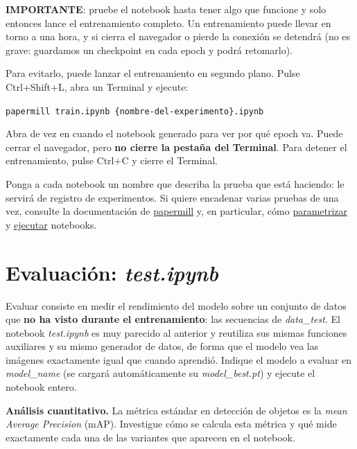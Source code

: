 \documentclass[12pt,a4paper]{article}
\begin{document}
\begin{framed}
    \textbf{IMPORTANTE}: pruebe el notebook hasta tener algo que funcione y solo entonces lance el entrenamiento completo. Un entrenamiento puede llevar en torno a una hora, y si cierra el navegador o pierde la conexión se detendrá (no es grave: guardamos un checkpoint en cada epoch y podrá retomarlo).

    Para evitarlo, puede lanzar el entrenamiento en segundo plano. Pulse Ctrl+Shift+L, abra un Terminal y ejecute:

    \begin{center}
        \texttt{papermill train.ipynb \{nombre-del-experimento\}.ipynb}
    \end{center}

    Abra de vez en cuando el notebook generado para ver por qué epoch va. Puede cerrar el navegador, pero \textbf{no cierre la pestaña del Terminal}. Para detener el entrenamiento, pulse Ctrl+C y cierre el Terminal.

    Ponga a cada notebook un nombre que describa la prueba que está haciendo: le servirá de registro de experimentos. Si quiere encadenar varias pruebas de una vez, consulte la documentación de \href{https://papermill.readthedocs.io/en/latest/index.html}{papermill} y, en particular, cómo \href{https://papermill.readthedocs.io/en/latest/usage-parameterize.html}{parametrizar} y \href{https://papermill.readthedocs.io/en/latest/usage-execute.html}{ejecutar} notebooks.
\end{framed}


\section{Evaluación: \textit{test.ipynb}}
\label{sec:semana2-test}

Evaluar consiste en medir el rendimiento del modelo sobre un conjunto de datos que \textbf{no ha visto durante el entrenamiento}: las secuencias de \textit{data\_test}. El notebook \textit{test.ipynb} es muy parecido al anterior y reutiliza sus mismas funciones auxiliares y su mismo generador de datos, de forma que el modelo vea las imágenes exactamente igual que cuando aprendió. Indique el modelo a evaluar en \textit{model\_name} (se cargará automáticamente su \textit{model\_best.pt}) y ejecute el notebook entero.

\textbf{Análisis cuantitativo.} La métrica estándar en detección de objetos es la \textit{mean Average Precision} (mAP). Investigue cómo se calcula esta métrica y qué mide exactamente cada una de las variantes que aparecen en el notebook.
\end{document}
